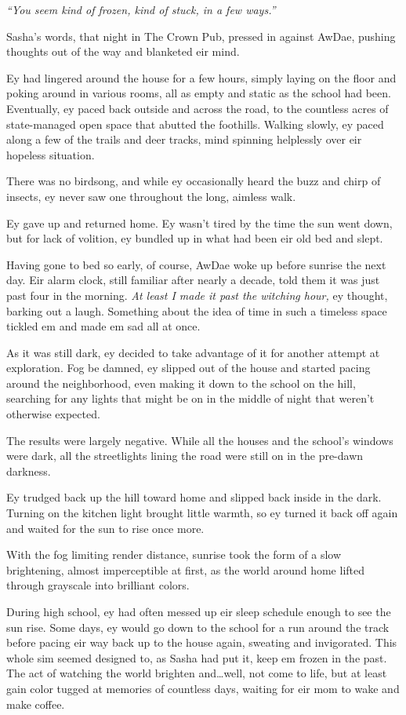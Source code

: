 \emph{``You seem kind of frozen, kind of stuck, in a few ways.''}

Sasha's words, that night in The Crown Pub, pressed in against AwDae, pushing thoughts out of the way and blanketed eir mind.

Ey had lingered around the house for a few hours, simply laying on the floor and poking around in various rooms, all as empty and static as the school had been. Eventually, ey paced back outside and across the road, to the countless acres of state-managed open space that abutted the foothills. Walking slowly, ey paced along a few of the trails and deer tracks, mind spinning helplessly over eir hopeless situation.

There was no birdsong, and while ey occasionally heard the buzz and chirp of insects, ey never saw one throughout the long, aimless walk.

Ey gave up and returned home. Ey wasn't tired by the time the sun went down, but for lack of volition, ey bundled up in what had been eir old bed and slept.

Having gone to bed so early, of course, AwDae woke up before sunrise the next day. Eir alarm clock, still familiar after nearly a decade, told them it was just past four in the morning. \emph{At least I made it past the witching hour,} ey thought, barking out a laugh. Something about the idea of time in such a timeless space tickled em and made em sad all at once.

As it was still dark, ey decided to take advantage of it for another attempt at exploration. Fog be damned, ey slipped out of the house and started pacing around the neighborhood, even making it down to the school on the hill, searching for any lights that might be on in the middle of night that weren't otherwise expected.

The results were largely negative. While all the houses and the school's windows were dark, all the streetlights lining the road were still on in the pre-dawn darkness.

Ey trudged back up the hill toward home and slipped back inside in the dark. Turning on the kitchen light brought little warmth, so ey turned it back off again and waited for the sun to rise once more.

With the fog limiting render distance, sunrise took the form of a slow brightening, almost imperceptible at first, as the world around home lifted through grayscale into brilliant colors.

During high school, ey had often messed up eir sleep schedule enough to see the sun rise. Some days, ey would go down to the school for a run around the track before pacing eir way back up to the house again, sweating and invigorated. This whole sim seemed designed to, as Sasha had put it, keep em frozen in the past. The act of watching the world brighten and\ldots{}well, not come to life, but at least gain color tugged at memories of countless days, waiting for eir mom to wake and make coffee.

